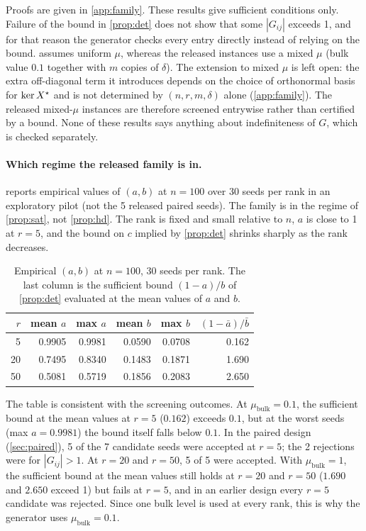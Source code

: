 Proofs are given in \cref{app:family}. These results give sufficient
conditions only. Failure of the bound in \cref{prop:det} does not show that
some $|G_{ij}|$ exceeds 1, and for that reason the generator checks every
entry directly instead of relying on the bound.  assumes
uniform $\mu$, whereas the released instances use a mixed $\mu$ (bulk value
$0.1$ together with $m$ copies of $\delta$).
The extension to mixed $\mu$ is left open: the extra off-diagonal term it
introduces depends on the choice of orthonormal basis for $\ker X^\star$ and is not
determined by $(n,r,m,\delta)$ alone (\cref{app:family}). The released
mixed-$\mu$ instances are therefore screened entrywise rather than certified
by a bound.
None of these results says anything about indefiniteness of $G$, which is
checked separately.

\paragraph{Which regime the released family is in.}
 reports empirical values of $(a,b)$ at $n=100$ over 30 seeds per
rank in an exploratory pilot (not the 5 released paired seeds). The family is in the regime of \cref{prop:sat}, not \cref{prop:hd}. The
rank is fixed and small relative to $n$, $a$ is close to 1 at $r=5$, and the
bound on $c$ implied by \cref{prop:det} shrinks sharply as the rank decreases.

\begin{table}[t]
\centering
\caption{Empirical $(a,b)$ at $n=100$, 30 seeds per rank. The last column is
the sufficient bound $(1-a)/b$ of \cref{prop:det} evaluated at the mean values
of $a$ and $b$.}
\label{tab:ab}
\small
\begin{tabular}{rrrrrr}
\toprule
$r$ & mean $a$ & max $a$ & mean $b$ & max $b$ & $(1-\bar a)/\bar b$\\
\midrule
5  & 0.9905 & 0.9981 & 0.0590 & 0.0708 & 0.162\\
20 & 0.7495 & 0.8340 & 0.1483 & 0.1871 & 1.690\\
50 & 0.5081 & 0.5719 & 0.1856 & 0.2083 & 2.650\\
\bottomrule
\end{tabular}
\end{table}

The table is consistent with the screening outcomes. At
$\mu_{\mathrm{bulk}}=0.1$, the sufficient bound at the mean values at $r=5$
($0.162$) exceeds $0.1$, but at the worst seeds (max $a=0.9981$) the bound
itself falls below $0.1$. In the
paired design (\cref{sec:paired}), 5 of the 7 candidate seeds were accepted at
$r=5$; the 2 rejections were for $|G_{ij}|>1$. At $r=20$ and $r=50$, 5 of 5
were accepted. With $\mu_{\mathrm{bulk}}=1$, the sufficient bound at the mean
values still holds at $r=20$ and $r=50$ ($1.690$ and $2.650$ exceed 1) but
fails at $r=5$, and in an earlier design every $r=5$ candidate was rejected.
Since one bulk level is used at every rank, this is why the generator uses
$\mu_{\mathrm{bulk}}=0.1$.

